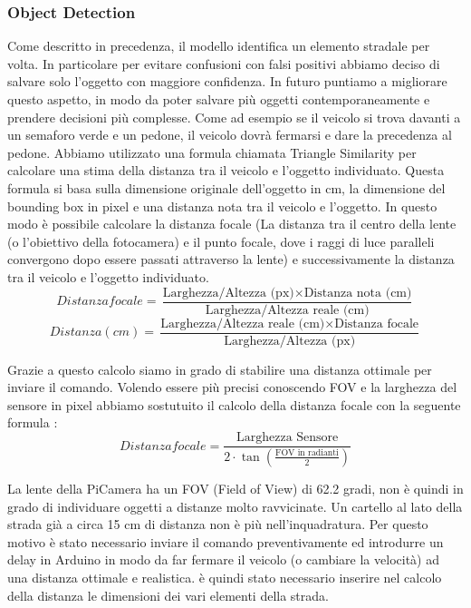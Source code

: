 \documentclass{article}
\begin{document}
    \subsubsection{Object Detection}
    Come descritto in precedenza, il modello identifica un elemento stradale per volta. In particolare per evitare confusioni con falsi positivi abbiamo deciso di salvare solo l'oggetto con maggiore confidenza. In futuro puntiamo a migliorare questo aspetto, in modo da poter salvare più oggetti contemporaneamente e prendere decisioni più complesse. Come ad esempio se il veicolo si trova davanti a un semaforo verde e un pedone, il veicolo dovrà fermarsi e dare la precedenza al pedone.
    Abbiamo utilizzato una formula chiamata \cite{distanza} Triangle Similarity per calcolare una stima della distanza tra il veicolo e l'oggetto individuato. Questa formula si basa sulla dimensione originale dell'oggetto in cm, la dimensione del bounding box in pixel e una distanza nota tra il veicolo e l'oggetto. In questo modo è possibile calcolare la distanza focale (La distanza tra il centro della lente (o l'obiettivo della fotocamera) e il punto focale, dove i raggi di luce paralleli convergono dopo essere passati attraverso la lente) e successivamente la distanza tra il veicolo e l'oggetto individuato.  
    \[
    Distanza focale = \frac{\text{Larghezza/Altezza (px)} \times \text{Distanza nota (cm)}}{\text{Larghezza/Altezza reale (cm)}}
    \]
    \[
    Distanza (cm) = \frac{\text{Larghezza/Altezza reale (cm)} \times \text{Distanza focale}}{\text{Larghezza/Altezza (px)}}
    \]

    Grazie a questo calcolo siamo in grado di stabilire una distanza ottimale per inviare il comando. Volendo essere più precisi conoscendo FOV e la larghezza del sensore in pixel abbiamo sostutuito il calcolo della distanza focale con la seguente formula \cite{focallenght}:
    \[
    Distanza focale = \frac{\text{Larghezza Sensore}}{2 \cdot \tan\left( \frac{\text{FOV in radianti}}{2} \right)}
    \]

    La lente della PiCamera ha un FOV (Field of View) di 62.2 gradi, non è quindi in grado di individuare oggetti a distanze molto ravvicinate. Un cartello al lato della strada già a circa 15 cm di distanza non è più nell'inquadratura. Per questo motivo è stato necessario inviare il comando preventivamente ed introdurre un delay in Arduino in modo da far fermare il veicolo (o cambiare la velocità) ad una distanza ottimale e realistica. 
    è quindi stato necessario inserire nel calcolo della distanza le dimensioni dei vari elementi della strada.    
\end{document}
